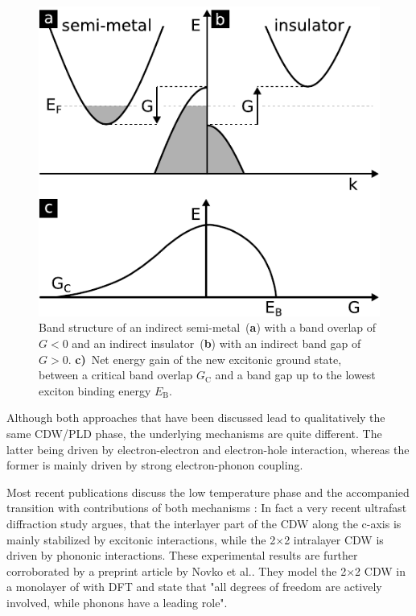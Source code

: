 \begin{figure}[!t]
	\begin{minipage}{0.5\columnwidth}
		\includegraphics[width=\columnwidth]{figs/excitonic_insulator.pdf}
	\end{minipage}
	\hspace{0.04\columnwidth}
	\begin{minipage}{0.45\columnwidth}
		\caption{Band structure of an indirect semi-metal~(\textbf{a}) with a band overlap of $G<0$ and an indirect insulator~(\textbf{b}) with an indirect band gap of $G>0$. \textbf{c)}~Net energy gain of the new excitonic ground state, between a critical band overlap $G_\mathrm{C}$ and a band gap up to the lowest exciton binding energy $E_\mathrm{B}$.}
		\label{fig:ei}
	\end{minipage}
\end{figure}

Although both approaches that have been discussed lead to qualitatively the same \ac{CDW}/\ac{PLD} phase, the underlying mechanisms are quite different.
The latter being driven by electron-electron and electron-hole interaction, whereas the former is mainly driven by strong electron-phonon coupling.

Most recent publications discuss the low temperature phase and the accompanied transition with contributions of both mechanisms \cite{hedayat2019,cheng2022,novko2022}:
In fact a very recent ultrafast diffraction study argues, that the interlayer part of the \ac{CDW} along the c-axis is mainly stabilized by excitonic interactions, while the 2$\times$2 intralayer \ac{CDW} is driven by phononic interactions\cite{cheng2022}.
These experimental results are further corroborated by a preprint article by Novko et al.\cite{novko2022}.
They model the 2$\times$2 \ac{CDW} in a monolayer of \ts\space with \ac{DFT} and state that "all degrees of freedom are actively involved, while phonons have a leading role".


